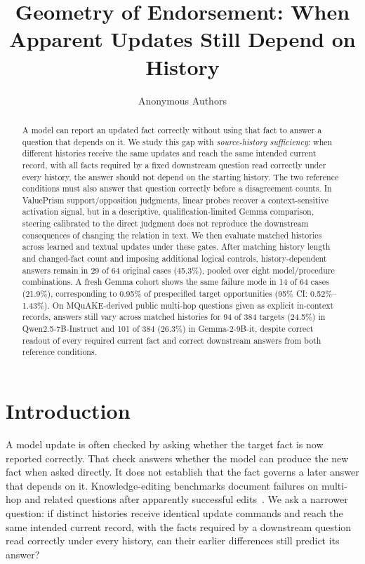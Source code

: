 \documentclass{article}
\title{Geometry of Endorsement: When Apparent Updates Still Depend on History}
\author{Anonymous Authors}
\begin{document}
\maketitle

\begin{abstract}
A model can report an updated fact correctly without using that fact to answer a question that depends on it. We study this gap with \emph{source-history sufficiency}: when different histories receive the same updates and reach the same intended current record, with all facts required by a fixed downstream question read correctly under every history, the answer should not depend on the starting history. The two reference conditions must also answer that question correctly before a disagreement counts. In ValuePrism support/opposition judgments, linear probes recover a context-sensitive activation signal, but in a descriptive, qualification-limited Gemma comparison, steering calibrated to the direct judgment does not reproduce the downstream consequences of changing the relation in text. We then evaluate matched histories across learned and textual updates under these gates. After matching history length and changed-fact count and imposing additional logical controls, history-dependent answers remain in 29 of 64 original cases (45.3\%), pooled over eight model/procedure combinations. A fresh Gemma cohort shows the same failure mode in 14 of 64 cases (21.9\%), corresponding to 0.95\% of prespecified target opportunities (95\% CI: 0.52\%--1.43\%). On MQuAKE-derived public multi-hop questions given as explicit in-context records, answers still vary across matched histories for 94 of 384 targets (24.5\%) in Qwen2.5-7B-Instruct and 101 of 384 (26.3\%) in Gemma-2-9B-it, despite correct readout of every required current fact and correct downstream answers from both reference conditions.
\end{abstract}

\section{Introduction}
A model update is often checked by asking whether the target fact is now reported correctly. That check answers whether the model can produce the new fact when asked directly. It does not establish that the fact governs a later answer that depends on it. Knowledge-editing benchmarks document failures on multi-hop and related questions after apparently successful edits~\citep{zhong2023mquake,cohen2024ripple,ju2024shortcuts}. We ask a narrower question: if distinct histories receive identical update commands and reach the same intended current record, with the facts required by a downstream question read correctly under every history, can their earlier differences still predict its answer?
\end{document}
